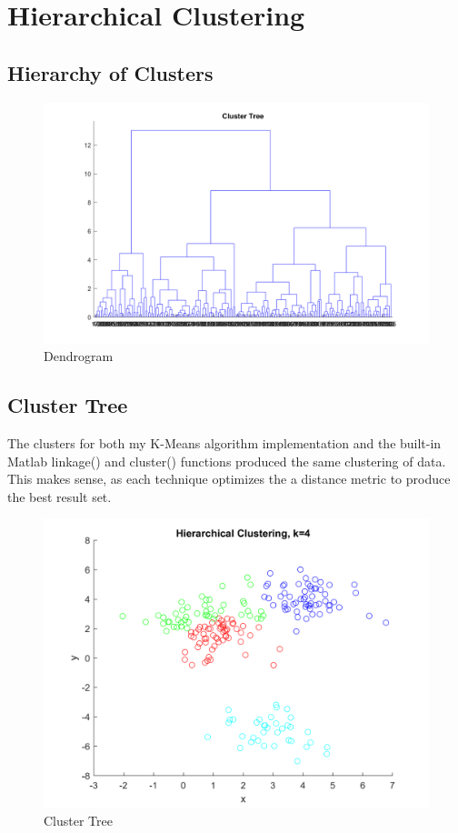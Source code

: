 \documentclass[12pt, letterpaper]{report}
\begin{document}
\section{Hierarchical Clustering}

\subsection{Hierarchy of Clusters}

\begin{figure}[H]
	\centering
	\includegraphics[width=0.6\columnwidth]{dendrogram.png}
	\caption{Dendrogram}
\end{figure}

\subsection{Cluster Tree}

The clusters for both my K-Means algorithm implementation and the built-in Matlab \mbox{linkage()} and \mbox{cluster()} functions produced the same clustering of data. This makes sense, as each technique optimizes the a distance metric to produce the best result set.

\begin{figure}[H]
	\centering
	\includegraphics[width=0.7\columnwidth]{cluster_hierarchical.png}
	\caption{Cluster Tree}
\end{figure}
\end{document}
